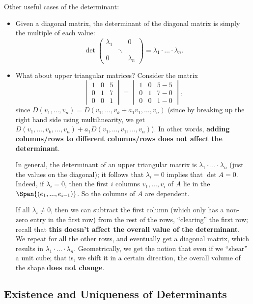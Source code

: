 \documentclass[math0540-lecture-notes.tex]{subfiles}
\begin{document}
Other useful cases of the determinant:
\begin{itemize}
  \item Given a diagonal matrix, the determinant of the diagonal matrix is simply the multiple of
    each value: \[
      \det{\begin{pmatrix} \lambda_1 & & 0 \\ & \ddots & \\ 0 & & \lambda_n \end{pmatrix}
      }=\lambda_1\cdot \ldots\cdot \lambda_n
    .\]
  \item What about upper triangular matrices? Consider the matrix \[
      \begin{vmatrix} 1&0&5\\0&1&7\\0&0&1 \end{vmatrix} =\begin{vmatrix} 1&0&5-5\\0&1&7-0\\0&0&1-0 \end{vmatrix} 
    ,\] since $D(v_1,\ldots,v_n)=D(v_1,\ldots,v_k+a_1v_1,\ldots,v_n)$ (since by breaking up the
    right hand side using multilinearity, we get
    $D(v_1,\ldots,v_k,\ldots,v_n)+a_1D(v_1,\ldots,v_1,\ldots,v_n)$). In other words, \textbf{adding
    columns/rows to different columns/rows does not affect the determinant}.

    In general, the determinant of an upper triangular matrix is \textbf{$\lambda_1\cdot \ldots\cdot
    \lambda_n$} (just the values on the diagonal); it follows that $\lambda_i=0$ implies that
    $\det{A}=0$. Indeed, if $\lambda_i=0$, then the first $i$ columns $v_1,\ldots,v_{i}$ of $A$ lie
    in the $\Span{(e_1,...,e_{i-1})}$. So the columns of $A$ are dependent.

    If all $\lambda_i\neq 0$, then we can subtract the first column (which only has a non-zero entry
    in the first row) from the rest of the rows, ``clearing'' the first row; recall that \textbf{this
    doesn't affect the overall value of the determinant}. We repeat for all the other rows, and
    eventually get a diagonal matrix, which results in $\lambda_1\cdot \ldots\cdot \lambda_n$.
    Geometrically, we get the notion that even if we ``shear'' a unit cube; that is, we shift it in
    a certain direction, the overall volume of the shape \textbf{does not change}.
\end{itemize}

\subsection{Existence and Uniqueness of Determinants}
\end{document}
